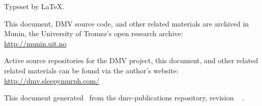 
Typeset by \LaTeX.

This document, DMV source code, and other related materials are archived in
Munin, the University of Tromsø's open research archive: \\
\url{http://munin.uit.no}

Active source repositories for the DMV project, this document, and other related
related materials can be found via the author's website: \\
\url{http://dmv.sleepymurph.com/}

This document generated \GITAuthorDate\ from the dmv-publications
repository, revision
\ifx\GITTags\empty
\GITAbrHash
\else
\GITAbrHash\ \GITTags
\fi
.
